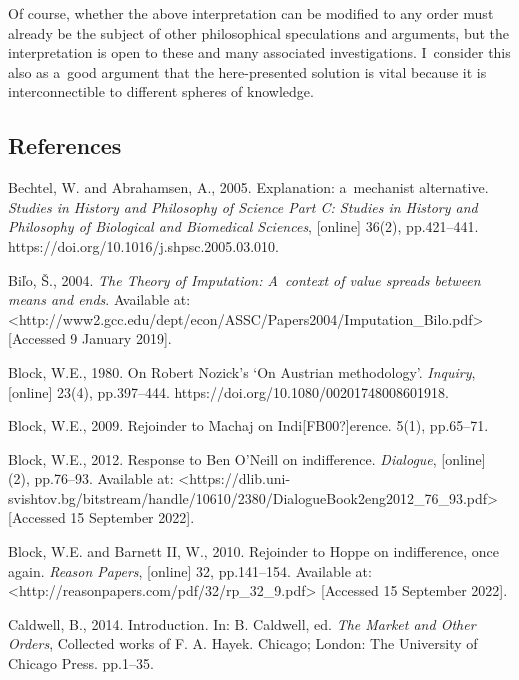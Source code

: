 Of course, whether the above interpretation can be modified to any order must already be the subject of other philosophical speculations and arguments, but the interpretation is open to these and many associated investigations. I~consider this also as a~good argument that the here-presented solution is vital because it is interconnectible to different spheres of knowledge.



\subsection{References}



Bechtel, W. and Abrahamsen, A., 2005. Explanation: a~mechanist alternative. \textit{Studies in History and Philosophy of Science Part C: Studies in History and Philosophy of Biological and Biomedical Sciences}, [online] 36(2), pp.421–441. https://doi.org/10.1016/j.shpsc.2005.03.010.



Biľo, Š., 2004. \textit{The Theory of Imputation: A~context of value spreads between means and ends}. Available at: {\textless}http://www2.gcc.edu/dept/econ/ASSC/Papers2004/Imputation\_Bilo.pdf{\textgreater} [Accessed 9 January 2019].



Block, W.E., 1980. On Robert Nozick's ‘On Austrian methodology'. \textit{Inquiry}, [online] 23(4), pp.397–444. https://doi.org/10.1080/00201748008601918.



Block, W.E., 2009. Rejoinder to Machaj on Indi[FB00?]erence. 5(1), pp.65–71.



Block, W.E., 2012. Response to Ben O'Neill on indifference. \textit{Dialogue}, [online] (2), pp.76–93. Available at: {\textless}https://dlib.uni-svishtov.bg/bitstream/handle/10610/2380/DialogueBook2eng2012\_76\_93.pdf{\textgreater} [Accessed 15 September 2022].



Block, W.E. and Barnett II, W., 2010. Rejoinder to Hoppe on indifference, once again. \textit{Reason Papers}, [online] 32, pp.141–154. Available at: {\textless}http://reasonpapers.com/pdf/32/rp\_32\_9.pdf{\textgreater} [Accessed 15 September 2022].



Caldwell, B., 2014. Introduction. In: B. Caldwell, ed. \textit{The Market and Other Orders}, Collected works of F. A. Hayek. Chicago; London: The University of Chicago Press. pp.1–35.



